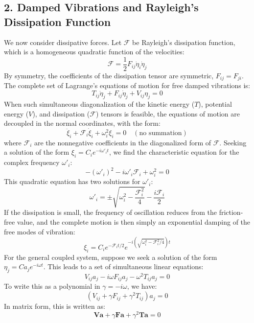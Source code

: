 \documentclass[12pt]{article}
\begin{document}
	\subsection*{2. Damped Vibrations and Rayleigh's Dissipation Function}
	We now consider dissipative forces. Let $\mathcal{F}$ be Rayleigh's dissipation function, which is a homogeneous quadratic function of the velocities:
	$$
	\mathcal{F} = \frac{1}{2} F_{ij} \dot{\eta}_i \dot{\eta}_j
	$$
	By symmetry, the coefficients of the dissipation tensor are symmetric, $F_{ij} = F_{ji}$. The complete set of Lagrange's equations of motion for free damped vibrations is:
	$$
	T_{ij}\ddot{\eta}_j + F_{ij}\dot{\eta}_j + V_{ij}\eta_j = 0
	$$
	When such simultaneous diagonalization of the kinetic energy ($T$), potential energy ($V$), and dissipation ($\mathcal{F}$) tensors is feasible, the equations of motion are decoupled in the normal coordinates, with the form:
	$$
	\ddot{\xi}_i + \mathcal{F}_i \dot{\xi}_i + \omega_i^2 \xi_i = 0 \quad (\text{no summation})
	$$
	where $\mathcal{F}_i$ are the nonnegative coefficients in the diagonalized form of $\mathcal{F}$. Seeking a solution of the form $\xi_i = C_i e^{-i\omega'_i t}$, we find the characteristic equation for the complex frequency $\omega'_i$:
	$$
	-(\omega'_i)^2 - i\omega'_i \mathcal{F}_i + \omega_i^2 = 0
	$$
	This quadratic equation has two solutions for $\omega'_i$:
	$$
	\omega'_i = \pm \sqrt{\omega_i^2 - \frac{\mathcal{F}_i^2}{4}} - \frac{i\mathcal{F}_i}{2}
	$$
	If the dissipation is small, the frequency of oscillation reduces from the friction-free value, and the complete motion is then simply an exponential damping of the free modes of vibration:
	$$
	\xi_i = C_i e^{-\mathcal{F}_i t/2} e^{-i \left( \sqrt{\omega_i^2 - \mathcal{F}_i^2/4} \right) t}
	$$
	For the general coupled system, suppose we seek a solution of the form $\eta_j = C a_j e^{-i\omega t}$. This leads to a set of simultaneous linear equations:
	$$
	V_{ij}a_j - i\omega F_{ij}a_j - \omega^2 T_{ij}a_j = 0
	$$
	To write this as a polynomial in $\gamma = -i\omega$, we have:
	$$
	(V_{ij} + \gamma F_{ij} + \gamma^2 T_{ij}) a_j = 0
	$$
	In matrix form, this is written as:
	$$
	\mathbf{V a} + \gamma \mathbf{F a} + \gamma^2 \mathbf{T a} = 0
	$$
	
\end{document}
